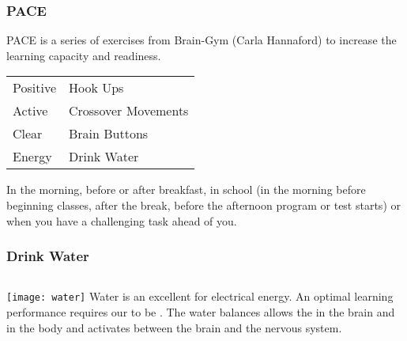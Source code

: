 \documentclass[../main.tex]{subfiles}
\begin{document}
\begin{frame}
\frametitle{PACE}
PACE is a series of exercises from Brain-Gym (Carla Hannaford) to increase the learning capacity and readiness.


\begin{tabular}{ll}
\alert{P}ositive & Hook Ups\\
\alert{A}ctive & Crossover Movements\\
\alert{C}lear & Brain Buttons\\
\alert{E}nergy & Drink Water\\
\end{tabular}

In the morning, before or after breakfast, in school (in the morning before beginning classes, after the break, before the afternoon program or test starts) or when you have a challenging task ahead of you.\\
\end{frame}
\begin{frame}
\frametitle{Drink Water}


\begin{columns}[c] %
\texttt{[image: water]}
Water is an excellent  for electrical energy. An optimal learning performance requires our  to be . The water balances allows the  in the brain and in the body and activates  between the brain and the nervous system.
\end{columns}
\end{frame}
\end{document}
